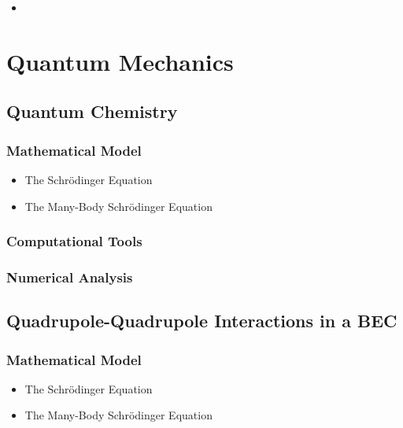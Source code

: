 \documentclass{report}
\begin{document}
            \begin{itemize}
                \item 
            \end{itemize}

\chapter{Quantum Mechanics} \label{sec:quantum}

    \section{Quantum Chemistry}

        \subsection{Mathematical Model}

            \begin{itemize}
                \item The Schr{\"o}dinger Equation
                \item The Many-Body Schr{\"o}dinger Equation
            \end{itemize}

        \subsection{Computational Tools}

        \subsection{Numerical Analysis}

    \section{Quadrupole-Quadrupole Interactions in a BEC}

        \subsection{Mathematical Model}

            \begin{itemize}
                \item The Schr{\"o}dinger Equation
                \item The Many-Body Schr{\"o}dinger Equation
            \end{itemize}
\end{document}
